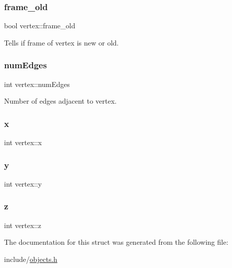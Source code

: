 \subsubsection{\texorpdfstring{frame\+\_\+old}{frame\_old}}
{\footnotesize\ttfamily bool vertex\+::frame\+\_\+old}



Tells if frame of vertex is new or old. 

\mbox{\label{structvertex_ae3c22df6081de2e3344055db29ae5b10}} 
\subsubsection{\texorpdfstring{num\+Edges}{numEdges}}
{\footnotesize\ttfamily int vertex\+::num\+Edges}



Number of edges adjacent to vertex. 

\mbox{\label{structvertex_a170e80128423a8b3307dd7908fc7564c}} 
\subsubsection{\texorpdfstring{x}{x}}
{\footnotesize\ttfamily int vertex\+::x}

\mbox{\label{structvertex_adc996af0584614ec01cdf8f23bdafc7b}} 
\subsubsection{\texorpdfstring{y}{y}}
{\footnotesize\ttfamily int vertex\+::y}

\mbox{\label{structvertex_a759224f594ddf22da9027decd6f90df0}} 
\subsubsection{\texorpdfstring{z}{z}}
{\footnotesize\ttfamily int vertex\+::z}



The documentation for this struct was generated from the following file\+:\begin{DoxyCompactItemize}
\item 
include/\mbox{\hyperlink{objects_8h}{objects.\+h}}\end{DoxyCompactItemize}
